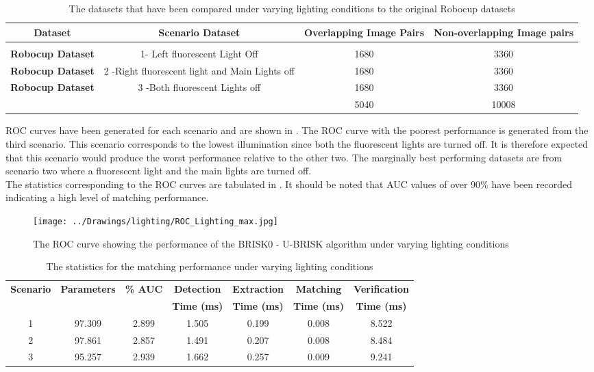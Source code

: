 \documentclass[11pt]{report}
\begin{document}
\begin{table}
\caption{The datasets that have been compared under varying lighting conditions
to the original Robocup datasets}
\footnotesize
\begin{tabular}{|c|c|c|c|}
\hline 
\textbf{Dataset} & \textbf{Scenario Dataset} & \textbf{Overlapping Image Pairs} & \textbf{Non-overlapping Image pairs}\tabularnewline
\hline 
\hline 
 &  &  & \tabularnewline
\hline 
\textbf{Robocup Dataset} & 1- Left fluorescent Light Off & 1680 & 3360\tabularnewline
\hline 
\textbf{Robocup Dataset} & 2 -Right fluorescent light and Main Lights off & 1680 & 3360\tabularnewline
\hline 
\textbf{Robocup Dataset} & 3 -Both fluorescent Lights off & 1680 & 3360\tabularnewline
\hline 
 &  & 5040 & 10008\tabularnewline
\hline 
\end{tabular}

\label{tab:datasetLighting}
\end{table}

ROC curves have been generated for each scenario and are shown in . The ROC curve with the poorest performance is generated from the third scenario. This scenario corresponds to the lowest illumination since both the fluorescent lights are turned off. It is therefore expected that this scenario would produce the worst performance relative to the other two. The marginally best performing datasets are from scenario two where a fluorescent light and the main lights are turned off. \\

The statistics corresponding to the ROC curves are tabulated in . It should be noted that AUC values of over $90\%$ have been recorded indicating a high level of matching performance. \\


\begin{figure}[h!] 
  \centering
    \texttt{[image: ../Drawings/lighting/ROC\_Lighting\_max.jpg]}
    \caption{The ROC curve showing the performance of the BRISK0 - U-BRISK algorithm under varying lighting conditions}
    \label{fig:rocLighting}
\end{figure}

\begin{table}
\caption{The statistics for the matching performance under varying lighting conditions}
\footnotesize
\begin{tabular}{|c|c|c|c|c|c|c|}
\hline 
\textbf{Scenario} & \textbf{Parameters} & \textbf{\% AUC} & \textbf{Detection} & \textbf{Extraction} & \textbf{Matching} & \textbf{Verification}\tabularnewline
 &  &  & \textbf{Time (ms)} & \textbf{Time (ms)} & \textbf{Time (ms)} & \textbf{Time (ms)}\tabularnewline
\hline 
\hline 
1 & 97.309 & 2.899 & 1.505 & 0.199 & 0.008 & 8.522\tabularnewline
\hline 
2 & 97.861 & 2.857 & 1.491 & 0.207 & 0.008 & 8.484\tabularnewline
\hline 
3 & 95.257 & 2.939 & 1.662 & 0.257 & 0.009 & 9.241\tabularnewline
\hline 
\end{tabular}
\label{tab:lightingStats}
\end{table}
\end{document}
